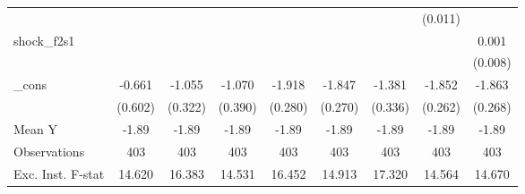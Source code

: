 {\begin{tabular}{l*{8}{c}}
            &                     &                     &                     &                     &                     &                     &     (0.011)         &                     \\
\addlinespace
shock\_f2s1  &                     &                     &                     &                     &                     &                     &                     &       0.001         \\
            &                     &                     &                     &                     &                     &                     &                     &     (0.008)         \\
\addlinespace
\_cons      &      -0.661         &      -1.055\sym{***}&      -1.070\sym{**} &      -1.918\sym{***}&      -1.847\sym{***}&      -1.381\sym{***}&      -1.852\sym{***}&      -1.863\sym{***}\\
            &     (0.602)         &     (0.322)         &     (0.390)         &     (0.280)         &     (0.270)         &     (0.336)         &     (0.262)         &     (0.268)         \\
\midrule
Mean Y      &       -1.89         &       -1.89         &       -1.89         &       -1.89         &       -1.89         &       -1.89         &       -1.89         &       -1.89         \\
Observations&         403         &         403         &         403         &         403         &         403         &         403         &         403         &         403         \\
Exc. Inst. F-stat&      14.620         &      16.383         &      14.531         &      16.452         &      14.913         &      17.320         &      14.564         &      14.670         \\
\bottomrule
\end{tabular}
}
